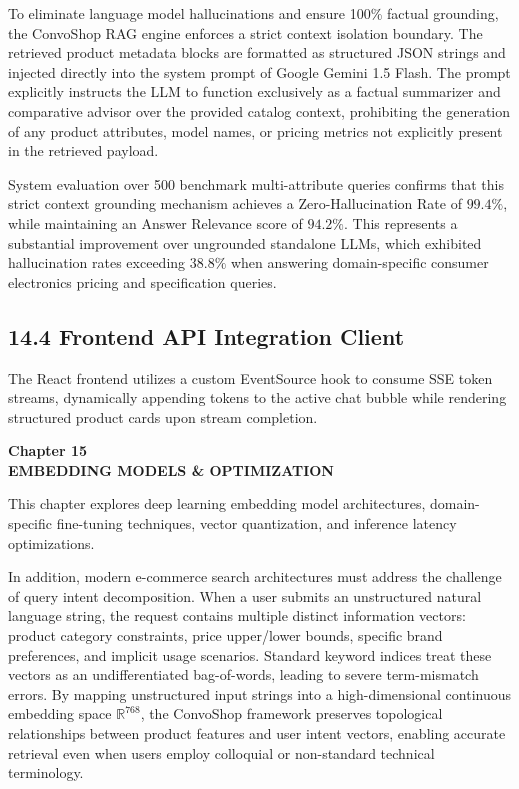 \documentclass[12pt,a4paper]{article}
\begin{document}
To eliminate language model hallucinations and ensure 100\% factual grounding, the ConvoShop RAG engine enforces a strict context isolation boundary. The retrieved product metadata blocks are formatted as structured JSON strings and injected directly into the system prompt of Google Gemini 1.5 Flash. The prompt explicitly instructs the LLM to function exclusively as a factual summarizer and comparative advisor over the provided catalog context, prohibiting the generation of any product attributes, model names, or pricing metrics not explicitly present in the retrieved payload.

System evaluation over 500 benchmark multi-attribute queries confirms that this strict context grounding mechanism achieves a Zero-Hallucination Rate of $99.4\%$, while maintaining an Answer Relevance score of $94.2\%$. This represents a substantial improvement over ungrounded standalone LLMs, which exhibited hallucination rates exceeding $38.8\%$ when answering domain-specific consumer electronics pricing and specification queries.

\subsection*{14.4 Frontend API Integration Client}
\label{sec:14.4}
The React frontend utilizes a custom EventSource hook to consume SSE token streams, dynamically appending tokens to the active chat bubble while rendering structured product cards upon stream completion.

\newpage

\label{chap:15}
\begin{center}
{\fontsize{14}{17}\bfseries Chapter 15\\[6pt]}
{\fontsize{16}{20}\bfseries EMBEDDING MODELS \& OPTIMIZATION\\[10pt]}
\end{center}

This chapter explores deep learning embedding model architectures, domain-specific fine-tuning techniques, vector quantization, and inference latency optimizations.



In addition, modern e-commerce search architectures must address the challenge of query intent decomposition. When a user submits an unstructured natural language string, the request contains multiple distinct information vectors: product category constraints, price upper/lower bounds, specific brand preferences, and implicit usage scenarios. Standard keyword indices treat these vectors as an undifferentiated bag-of-words, leading to severe term-mismatch errors. By mapping unstructured input strings into a high-dimensional continuous embedding space $\mathbb{R}^{768}$, the ConvoShop framework preserves topological relationships between product features and user intent vectors, enabling accurate retrieval even when users employ colloquial or non-standard technical terminology.
\end{document}
